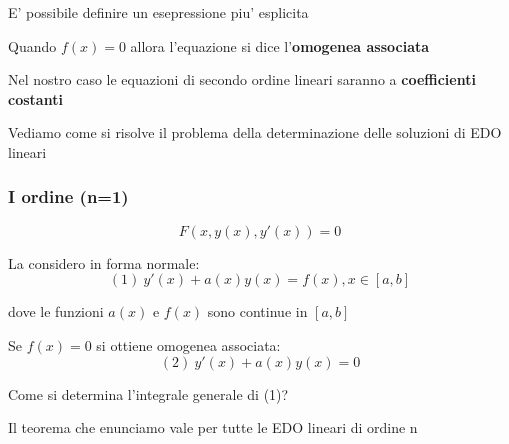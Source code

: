 \documentclass[11pt]{article}
\begin{document}
E' possibile definire un esepressione piu' esplicita




Quando $f(x)=0$ allora l'equazione si dice l'\textbf{omogenea associata} 


Nel nostro caso le equazioni di secondo ordine lineari saranno a \textbf{coefficienti costanti}


Vediamo come si risolve il problema della determinazione delle soluzioni di EDO lineari


\subsubsection{I ordine (n=1)}

\[
    F(x,y(x),y'(x))=0
\]

La considero in forma normale:
\[
    (1)\ y'(x)+a(x)y(x)=f(x), x \in [a,b]
\]

dove le funzioni $a(x)$ e $f(x)$ sono continue in $[a,b]$


Se $f(x)=0$ si ottiene omogenea associata:
\[
    (2)\ y'(x)+a(x)y(x)=0
\]

Come si determina l'integrale generale di (1)?

Il teorema che enunciamo vale per tutte le EDO lineari di ordine n

\end{document}
